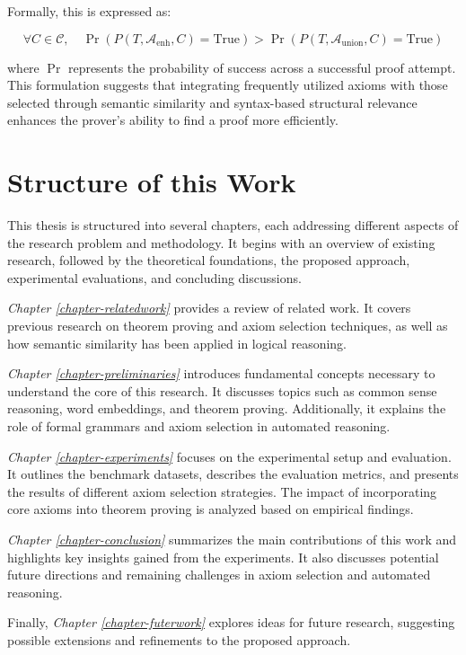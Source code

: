 \documentclass[english,version-2020-11]{uzl-thesis}
\begin{document}
Formally, this is expressed as:

\begin{equation}
    \forall C \in \mathcal{C}, \quad \Pr(P(T, \mathcal{A}_{\text{enh}}, C) = \text{True}) > \Pr(P(T, \mathcal{A}_{\text{union}}, C) = \text{True})
\end{equation}

where \( \Pr \) represents the probability of success across a successful proof attempt. This formulation suggests that integrating frequently utilized axioms with those selected through semantic similarity and syntax-based structural relevance enhances the prover’s ability to find a proof more efficiently.


\section{Structure of this Work}

This thesis is structured into several chapters, each addressing different aspects of the research problem and methodology. It begins with an overview of existing research, followed by the theoretical foundations, the proposed approach, experimental evaluations, and concluding discussions.

\textit{Chapter \ref{chapter-relatedwork}} provides a review of related work. It covers previous research on theorem proving and axiom selection techniques, as well as how semantic similarity has been applied in logical reasoning.

\textit{Chapter \ref{chapter-preliminaries}} introduces fundamental concepts necessary to understand the core of this research. It discusses topics such as common sense reasoning, word embeddings, and theorem proving. Additionally, it explains the role of formal grammars and axiom selection in automated reasoning.

\textit{Chapter \ref{chapter-experiments}} focuses on the experimental setup and evaluation. It outlines the benchmark datasets, describes the evaluation metrics, and presents the results of different axiom selection strategies. The impact of incorporating core axioms into theorem proving is analyzed based on empirical findings.

\textit{Chapter \ref{chapter-conclusion}} summarizes the main contributions of this work and highlights key insights gained from the experiments. It also discusses potential future directions and remaining challenges in axiom selection and automated reasoning.

Finally, \textit{Chapter \ref{chapter-futerwork}} explores ideas for future research, suggesting possible extensions and refinements to the proposed approach.
\end{document}
